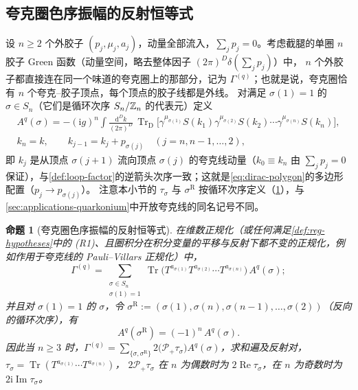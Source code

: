 \documentclass[UTF8,a4paper,11pt,fontset=fandol]{ctexart}
\let\amsmathbb\mathbb
\renewcommand{\mathbb}[1]{\ifx1#1\mathds{1}\else\amsmathbb{#1}\fi}
\theoremstyle{cplain}
\newtheorem{proposition}[theorem]{命题}
\theoremstyle{cdefinition}
\theoremstyle{cremark}
\numberwithin{equation}{section}
\DeclareMathOperator{\Tr}{Tr}
\DeclareMathOperator{\Real}{Re}
\DeclareMathOperator{\Imag}{Im}
\newcommand{\TrD}{\operatorname{Tr}_{\mathrm{D}}}   %
\newcommand{\dd}{\mathrm{d}}                         %
\newcommand{\Pp}{\mathcal{P}_{+}}                    %
\newcommand{\ii}{\mathrm{i}}                        %
\begin{document}
\subsection{夸克圈色序振幅的反射恒等式}\label{sec:applications-reflection}

设 $n\ge2$ 个外胶子 $(p_j,\mu_j,a_j)$，动量全部流入，$\sum_jp_j=0$。考虑截腿的单圈 $n$ 胶子 Green 函数（动量空间，略去整体因子 $(2\pi)^D\delta(\sum_jp_j)$）中，
$n$ 个外胶子都直接连在同一个味道的夸克圈上的那部分，记为 $\Gamma^{(q)}$；也就是说，夸克圈恰有 $n$ 个夸克--胶子顶点，每个顶点的胶子线都是外线。
对满足 $\sigma(1)=1$ 的 $\sigma\in S_n$（它们是循环次序 $S_n/\mathbb Z_n$ 的代表元）定义
\begin{equation}\label{eq:app-refl-A}
\begin{gathered}
A^q(\sigma)=-(\ii g)^n\!\int\!\frac{\dd^Dk}{(2\pi)^D}\,\TrD\bigl[\gamma^{\mu_{\sigma(1)}}S(k_1)\gamma^{\mu_{\sigma(2)}}S(k_2)\cdots\gamma^{\mu_{\sigma(n)}}S(k_n)\bigr],\\
k_n=k,\qquad k_{j-1}=k_j+p_{\sigma(j)}\quad(j=n,n-1,\dots,2),
\end{gathered}
\end{equation}
即 $k_j$ 是从顶点 $\sigma(j+1)$ 流向顶点 $\sigma(j)$ 的夸克线动量（$k_0\equiv k_n$ 由 $\sum_jp_j=0$ 保证），与\cref{def:loop-factor}的逆箭头次序一致；这就是\cref{eq:dirac-polygon}的多边形配置（$p_j\to p_{\sigma(j)}$）。
注意本小节的 $\tau_\sigma$ 与 $\sigma^{\mathrm R}$ 按循环次序定义（\cref{prop:app-reflection}），与\cref{sec:applications-quarkonium}中开放夸克线的同名记号不同。

\begin{proposition}[夸克圈色序振幅的反射恒等式]\label{prop:app-reflection}
在维数正规化（或任何满足\cref{def:reg-hypotheses}中的 (R1)、且圈积分在积分变量的平移与反射下都不变的正规化，例如作用于夸克线的 Pauli--Villars 正规化）中，
\begin{equation}\label{eq:app-refl-decomp}
\Gamma^{(q)}=\sum_{\substack{\sigma\in S_n\\ \sigma(1)=1}}\Tr\bigl(T^{a_{\sigma(1)}}T^{a_{\sigma(2)}}\cdots T^{a_{\sigma(n)}}\bigr)\,A^q(\sigma);
\end{equation}
并且对 $\sigma(1)=1$ 的 $\sigma$，令 $\sigma^{\mathrm R}:=(\sigma(1),\sigma(n),\sigma(n-1),\dots,\sigma(2))$（反向的循环次序），有
\begin{equation}\label{eq:app-refl}
A^q(\sigma^{\mathrm R})=(-1)^n\,A^q(\sigma).
\end{equation}
因此当 $n\ge3$ 时，$\Gamma^{(q)}=\sum_{\{\sigma,\sigma^{\mathrm R}\}}2\bigl(\Pp\tau_\sigma\bigr)A^q(\sigma)$，求和遍及反射对，$\tau_\sigma=\Tr(T^{a_{\sigma(1)}}\cdots T^{a_{\sigma(n)}})$，
$2\Pp\tau_\sigma$ 在 $n$ 为偶数时为 $2\Real\tau_\sigma$，在 $n$ 为奇数时为 $2\ii\Imag\tau_\sigma$。
\end{proposition}
\end{document}
